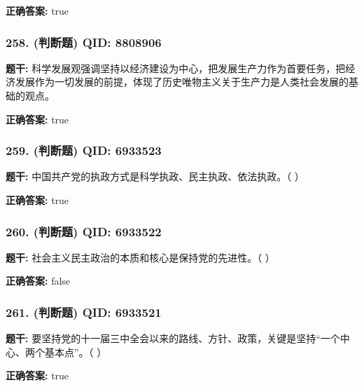 \documentclass[12pt,UTF8]{ctexart}
\begin{document}
\textbf{正确答案:}
true

\vspace{0.3em}\hrulefill\vspace{0.7em}

\subsubsection*{258. (判断题) \small QID: 8808906}

\textbf{题干:}
科学发展观强调坚持以经济建设为中心，把发展生产力作为首要任务，把经济发展作为一切发展的前提，体现了历史唯物主义关于生产力是人类社会发展的基础的观点。

\textbf{正确答案:}
true

\vspace{0.3em}\hrulefill\vspace{0.7em}

\subsubsection*{259. (判断题) \small QID: 6933523}

\textbf{题干:}
中国共产党的执政方式是科学执政、民主执政、依法执政。（ ）

\textbf{正确答案:}
true

\vspace{0.3em}\hrulefill\vspace{0.7em}

\subsubsection*{260. (判断题) \small QID: 6933522}

\textbf{题干:}
社会主义民主政治的本质和核心是保持党的先进性。（ ）

\textbf{正确答案:}
false

\vspace{0.3em}\hrulefill\vspace{0.7em}

\subsubsection*{261. (判断题) \small QID: 6933521}

\textbf{题干:}
要坚持党的十一届三中全会以来的路线、方针、政策，关键是坚持“一个中心、两个基本点”。（ ）

\textbf{正确答案:}
true

\vspace{0.3em}\hrulefill\vspace{0.7em}
\end{document}
